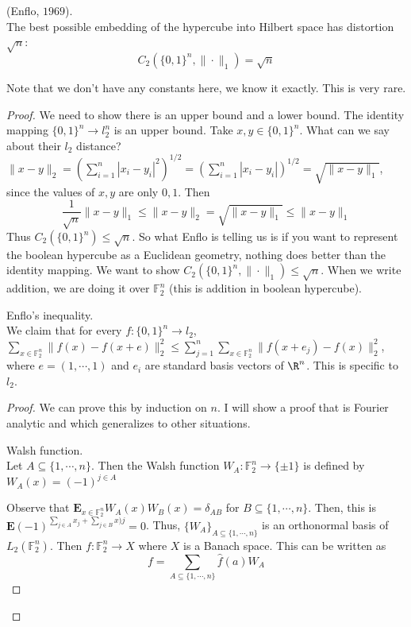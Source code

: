 \begin{thm} (Enflo, $1969$). \\
The best possible embedding of the hypercube into Hilbert space has distortion $\sqrt{n}$: 
\[
C_2(\{0, 1\}^n, \| \cdot \|_1) = \sqrt{n}
\]
\end{thm}
Note that we don't have any constants here, we know it exactly. This is very rare. 
\begin{proof}
We need to show there is an upper bound and a lower bound. The identity mapping $\{0, 1\}^n \to l_2^n$ is an upper bound. Take $x, y \in \{0, 1\}^n$. What can we say about their $l_2$ distance? $\|x - y\|_2 = \left(\sum_{i = 1}^n |x_i - y_i|^2 \right)^{1/2} = \left(\sum_{i = 1}^n |x_i - y_i| \right)^{1/2} = \sqrt{\|x - y\|_1}$, since the values of $x, y$ are only $0, 1$. Then
\[
\frac{1}{\sqrt{n}} \|x - y\|_1 \leq \|x - y\|_2 = \sqrt{\|x - y\|_1} \leq \|x - y\|_1
\]
Thus $C_2(\{0, 1\}^n) \leq \sqrt{n}$. 
So what Enflo is telling us is if you want to represent the boolean hypercube as a Euclidean geometry, nothing does better than the identity mapping.
We want to show $C_2(\{0, 1\}^n, \|\cdot\|_1) \leq \sqrt{n}$. When we write addition, we are doing it over $\mathbb{F}_2^n$ (this is addition in boolean hypercube). 
\begin{lem} Enflo's inequality. \\
We claim that for every $f: \{0, 1\}^n \to l_2$, $\sum_{x \in \mathbb{F}_2^n}\|f(x) - f(x + e)\|_2^2 \leq \sum_{j = 1}^n \sum_{x \in \mathbb{F}_2^n} \|f(x + e_j) - f(x)\|_2^2$, where $e = (1, \cdots, 1)$ and $e_i$ are standard basis vectors of $\R^n$. This is specific to $l_2$.
\end{lem}
\begin{proof} 
We can prove this by induction on $n$. I will show a proof that is Fourier analytic and which generalizes to other situations.
\begin{df} Walsh function. \\
Let $A \subseteq \{1, \cdots, n\}$. Then the Walsh function $W_A: \mathbb{F}_2^n \to \{\pm 1\}$ is defined by 
$W_A(x) = (-1)^{j \in A}$
\end{df}
Observe that $\textbf{E}_{x \in \mathbb{F}_2^n}W_A(x)W_B(x) = \delta_{AB}$ for $B \subseteq \{1, \cdots, n\}$. 
Then, this is $\textbf{E}{(-1)^{\sum_{j \in A} x_j + \sum_{j \in B} x)j}} = 0$. Thus, $\{W_A\}_{A \subseteq \{1, \cdots, n\}}$ is an orthonormal basis of $L_2(\mathbb{F}_2^n)$. Then $f: \mathbb{F}_2^n \to X$  where $X$ is a Banach space. This can be written as 
\[
f = \sum_{A \subseteq \{1, \cdots, n\}} \hat{f}(a)W_A
\]
\end{proof}
\end{proof}
